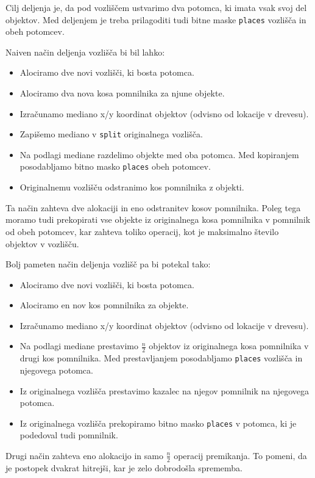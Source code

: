 \documentclass[a4paper,12pt]{article}
\begin{document}
Cilj deljenja je, da pod vozliščem ustvarimo dva potomca, ki imata vsak svoj del objektov. Med deljenjem
je treba prilagoditi tudi bitne maske \lstinline|places| vozlišča in obeh potomcev.

Naiven način deljenja vozlišča bi bil lahko:
\begin{itemize}
    \item Alociramo dve novi vozlišči, ki bosta potomca.
    \item Alociramo dva nova kosa pomnilnika za njune objekte.
    \item Izračunamo mediano x/y koordinat objektov (odvisno od lokacije v drevesu).
    \item Zapišemo mediano v \lstinline|split| originalnega vozlišča.
    \item Na podlagi mediane razdelimo objekte med oba potomca. Med kopiranjem
    posodabljamo bitno masko \lstinline|places| obeh potomcev.
    \item Originalnemu vozlišču odstranimo kos pomnilnika z objekti.
\end{itemize}
Ta način zahteva dve alokaciji in eno odstranitev kosov pomnilnika. Poleg tega moramo tudi prekopirati
vse objekte iz originalnega kosa pomnilnika v pomnilnik od obeh potomcev, kar zahteva toliko operacij, kot
je maksimalno število objektov v vozlišču.

Bolj pameten način deljenja vozlišč pa bi potekal tako:
\begin{itemize}
    \item Alociramo dve novi vozlišči, ki bosta potomca.
    \item Alociramo en nov kos pomnilnika za objekte.
    \item Izračunamo mediano x/y koordinat objektov (odvisno od lokacije v drevesu).
    \item Na podlagi mediane prestavimo $ \frac{n}{2}$ objektov iz originalnega kosa pomnilnika
    v drugi kos pomnilnika. Med prestavljanjem posodabljamo \lstinline|places| vozlišča in njegovega potomca.
    \item Iz originalnega vozlišča prestavimo kazalec na njegov pomnilnik na njegovega potomca.
    \item Iz originalnega vozlišča prekopiramo bitno masko \lstinline|places| v potomca, ki je podedoval tudi pomnilnik.
\end{itemize}
Drugi način zahteva eno alokacijo in samo $\frac{n}{2}$ operacij premikanja. To pomeni, da je postopek
dvakrat hitrejši, kar je zelo dobrodošla sprememba.
\end{document}
